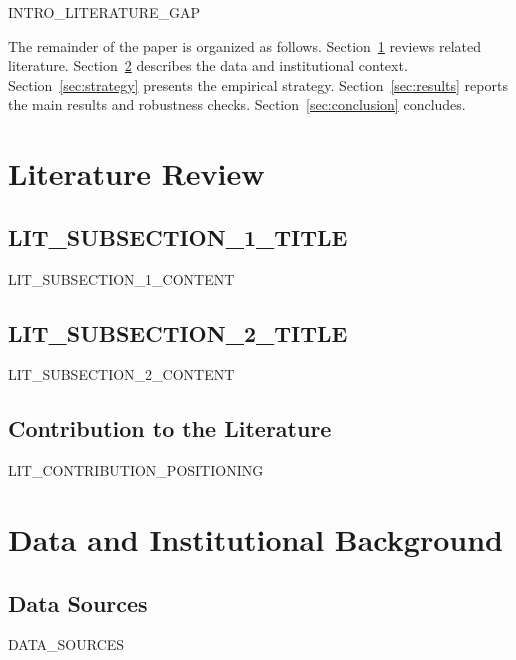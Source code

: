 {{INTRO_LITERATURE_GAP}}

The remainder of the paper is organized as follows.
Section~\ref{sec:literature} reviews related literature.
Section~\ref{sec:data} describes the data and institutional context.
Section~\ref{sec:strategy} presents the empirical strategy.
Section~\ref{sec:results} reports the main results and robustness checks.
Section~\ref{sec:conclusion} concludes.


\section{Literature Review}
\label{sec:literature}

\subsection{{{LIT_SUBSECTION_1_TITLE}}}
{{LIT_SUBSECTION_1_CONTENT}}

\subsection{{{LIT_SUBSECTION_2_TITLE}}}
{{LIT_SUBSECTION_2_CONTENT}}

\subsection{Contribution to the Literature}
{{LIT_CONTRIBUTION_POSITIONING}}


\section{Data and Institutional Background}
\label{sec:data}

\subsection{Data Sources}
{{DATA_SOURCES}}

